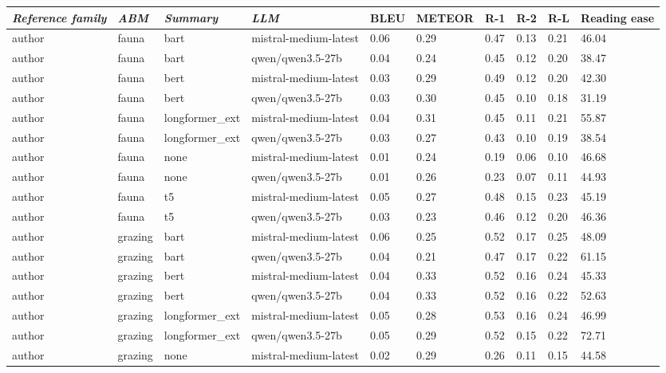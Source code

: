 \begin{tabular}{|l|l|l|l|l|l|l|l|l|l|}
\hline
\textit{\textbf{Reference family}} & \textit{\textbf{ABM}} & \textit{\textbf{Summary}} & \textit{\textbf{LLM}} & BLEU & METEOR & R-1 & R-2 & R-L & Reading ease \\
 \hline
 author & fauna & bart & mistral-medium-latest & 0.06 & 0.29 & 0.47 & 0.13 & 0.21 & 46.04 \\
 \hline
 author & fauna & bart & qwen/qwen3.5-27b & 0.04 & 0.24 & 0.45 & 0.12 & 0.20 & 38.47 \\
 \hline
 author & fauna & bert & mistral-medium-latest & 0.03 & 0.29 & 0.49 & 0.12 & 0.20 & 42.30 \\
 \hline
 author & fauna & bert & qwen/qwen3.5-27b & 0.03 & 0.30 & 0.45 & 0.10 & 0.18 & 31.19 \\
 \hline
 author & fauna & longformer\_ext & mistral-medium-latest & 0.04 & 0.31 & 0.45 & 0.11 & 0.21 & 55.87 \\
 \hline
 author & fauna & longformer\_ext & qwen/qwen3.5-27b & 0.03 & 0.27 & 0.43 & 0.10 & 0.19 & 38.54 \\
 \hline
 author & fauna & none & mistral-medium-latest & 0.01 & 0.24 & 0.19 & 0.06 & 0.10 & 46.68 \\
 \hline
 author & fauna & none & qwen/qwen3.5-27b & 0.01 & 0.26 & 0.23 & 0.07 & 0.11 & 44.93 \\
 \hline
 author & fauna & t5 & mistral-medium-latest & 0.05 & 0.27 & 0.48 & 0.15 & 0.23 & 45.19 \\
 \hline
 author & fauna & t5 & qwen/qwen3.5-27b & 0.03 & 0.23 & 0.46 & 0.12 & 0.20 & 46.36 \\
 \hline
 author & grazing & bart & mistral-medium-latest & 0.06 & 0.25 & 0.52 & 0.17 & 0.25 & 48.09 \\
 \hline
 author & grazing & bart & qwen/qwen3.5-27b & 0.04 & 0.21 & 0.47 & 0.17 & 0.22 & 61.15 \\
 \hline
 author & grazing & bert & mistral-medium-latest & 0.04 & 0.33 & 0.52 & 0.16 & 0.24 & 45.33 \\
 \hline
 author & grazing & bert & qwen/qwen3.5-27b & 0.04 & 0.33 & 0.52 & 0.16 & 0.22 & 52.63 \\
 \hline
 author & grazing & longformer\_ext & mistral-medium-latest & 0.05 & 0.28 & 0.53 & 0.16 & 0.24 & 46.99 \\
 \hline
 author & grazing & longformer\_ext & qwen/qwen3.5-27b & 0.05 & 0.29 & 0.52 & 0.15 & 0.22 & 72.71 \\
 \hline
 author & grazing & none & mistral-medium-latest & 0.02 & 0.29 & 0.26 & 0.11 & 0.15 & 44.58 \\

\end{tabular}
